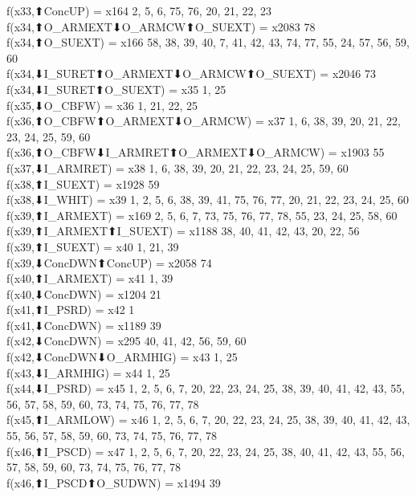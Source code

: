 f(x33,⬆ConcUP) = x164 {2, 5, 6, 75, 76, 20, 21, 22, 23} \\
f(x34,⬆O_ARMEXT⬇O_ARMCW⬆O_SUEXT) = x2083 {78} \\
f(x34,⬆O_SUEXT) = x166 {58, 38, 39, 40, 7, 41, 42, 43, 74, 77, 55, 24, 57, 56, 59, 60} \\
f(x34,⬇I_SURET⬆O_ARMEXT⬇O_ARMCW⬆O_SUEXT) = x2046 {73} \\
f(x34,⬇I_SURET⬆O_SUEXT) = x35 {1, 25} \\
f(x35,⬇O_CBFW) = x36 {1, 21, 22, 25} \\
f(x36,⬆O_CBFW⬆O_ARMEXT⬇O_ARMCW) = x37 {1, 6, 38, 39, 20, 21, 22, 23, 24, 25, 59, 60} \\
f(x36,⬆O_CBFW⬇I_ARMRET⬆O_ARMEXT⬇O_ARMCW) = x1903 {55} \\
f(x37,⬇I_ARMRET) = x38 {1, 6, 38, 39, 20, 21, 22, 23, 24, 25, 59, 60} \\
f(x38,⬆I_SUEXT) = x1928 {59} \\
f(x38,⬇I_WHIT) = x39 {1, 2, 5, 6, 38, 39, 41, 75, 76, 77, 20, 21, 22, 23, 24, 25, 60} \\
f(x39,⬆I_ARMEXT) = x169 {2, 5, 6, 7, 73, 75, 76, 77, 78, 55, 23, 24, 25, 58, 60} \\
f(x39,⬆I_ARMEXT⬆I_SUEXT) = x1188 {38, 40, 41, 42, 43, 20, 22, 56} \\
f(x39,⬆I_SUEXT) = x40 {1, 21, 39} \\
f(x39,⬇ConcDWN⬆ConcUP) = x2058 {74} \\
f(x40,⬆I_ARMEXT) = x41 {1, 39} \\
f(x40,⬇ConcDWN) = x1204 {21} \\
f(x41,⬆I_PSRD) = x42 {1} \\
f(x41,⬇ConcDWN) = x1189 {39} \\
f(x42,⬇ConcDWN) = x295 {40, 41, 42, 56, 59, 60} \\
f(x42,⬇ConcDWN⬇O_ARMHIG) = x43 {1, 25} \\
f(x43,⬇I_ARMHIG) = x44 {1, 25} \\
f(x44,⬇I_PSRD) = x45 {1, 2, 5, 6, 7, 20, 22, 23, 24, 25, 38, 39, 40, 41, 42, 43, 55, 56, 57, 58, 59, 60, 73, 74, 75, 76, 77, 78} \\
f(x45,⬆I_ARMLOW) = x46 {1, 2, 5, 6, 7, 20, 22, 23, 24, 25, 38, 39, 40, 41, 42, 43, 55, 56, 57, 58, 59, 60, 73, 74, 75, 76, 77, 78} \\
f(x46,⬆I_PSCD) = x47 {1, 2, 5, 6, 7, 20, 22, 23, 24, 25, 38, 40, 41, 42, 43, 55, 56, 57, 58, 59, 60, 73, 74, 75, 76, 77, 78} \\
f(x46,⬆I_PSCD⬆O_SUDWN) = x1494 {39} \\
